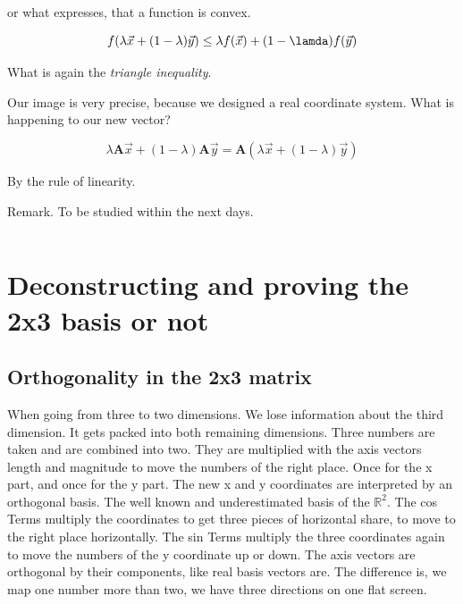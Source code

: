 \documentclass[a4paper]{article}
\begin{document}
or what expresses, that a function is convex.

\begin{displaymath}
f(\lambda\vec{x} + (1-\lambda)\vec{y}) \leq \lambda f(\vec{x}) + (1-\lamda)f(\vec{y})
\end{displaymath}

What is again the \emph{triangle inequality}.

Our image is very precise, because we designed a real coordinate system. What is happening to our new vector? 

\begin{displaymath}
\lambda\boldsymbol{A}\vec{x} + (1-\lambda)\boldsymbol{A}\vec{y} = \boldsymbol{A}(\lambda\vec{x} + (1-\lambda)\vec{y})
\end{displaymath}

By the rule of linearity.

Remark. To be studied within the next days. 

\begin{displaymath}
\end{displaymath}

\section{Deconstructing and proving the 2x3 basis or not}

\subsection{Orthogonality in the 2x3 matrix}

When going from three to two dimensions. We lose information about the third dimension.
It gets packed into both remaining dimensions. Three numbers are taken and are combined into two.
They are multiplied with the axis vectors length and magnitude to move the numbers of the right place.
Once for the x part, and once for the y part. The new x and y coordinates are interpreted by an orthogonal basis.
The well known and underestimated basis of the $\mathbb{R}^{2}$. The cos Terms multiply the coordinates to get 
three pieces of horizontal share, to move to the right place horizontally. The sin Terms multiply the three coordinates
again to move the numbers of the y coordinate up or down. The axis vectors are orthogonal by their components, like
real basis vectors are. The difference is, we map one number more than two, we have three directions on one flat screen.\\
\end{document}
